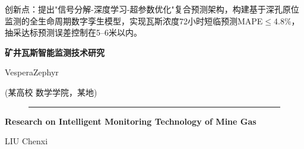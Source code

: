 \documentclass[twocolumn,a4paper]{ctexart}
\numberwithin{equation}{section}
\newenvironment{firstpagefootnote}{
  \noindent\rule{\textwidth}{0.4pt}\par\vspace{0.5\baselineskip}
  \zihao{-5}\songti\linespread{1.2}\selectfont
  \setlength{\parindent}{0pt}
}{
  \par\vspace{-0.5\baselineskip}
}
\begin{document}
\begin{center}
\songti
创新点：提出"信号分解-深度学习-超参数优化"复合预测架构，构建基于深孔原位监测的全生命周期数字孪生模型，实现瓦斯浓度72小时短临预测MAPE$\leq$4.8\%，抽采达标预测误差控制在5--6米以内。
\end{center}

\vspace{1\baselineskip}

\begin{center}
\heiti\bfseries
矿井瓦斯智能监测技术研究
\end{center}

\vspace{0.5\baselineskip}

\begin{center}
\songti
VesperaZephyr
\end{center}

\vspace{0.3\baselineskip}

\begin{center}
\songti
(某高校 数学学院，某地)
\end{center}


\vspace{1\baselineskip}
\begin{figure}[b]
\begin{firstpagefootnote}
\end{firstpagefootnote}
\end{figure}

\begin{center}
\bfseries
Research on Intelligent Monitoring Technology of Mine Gas
\end{center}

\vspace{0.5\baselineskip}

\begin{center}
LIU Chenxi
\end{center}

\vspace{0.3\baselineskip}
\end{document}
